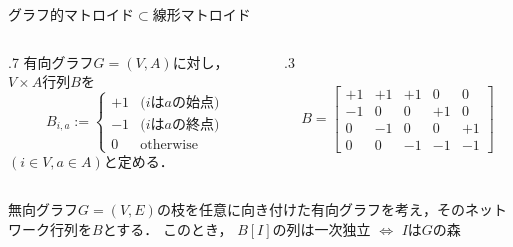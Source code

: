 \documentclass[14pt,aspectratio=169,xcolor=dvipsnames,table,onlytextwidth,dvipdfmx]{beamer}
\begin{document}
\begin{frame}{グラフ的マトロイド$\subset$線形マトロイド}
    \small

    \bigskip
    \begin{columns}
    \begin{column}{.7\textwidth}
     有向グラフ$G = (V, A)$に対し，\\ 
    $V \times A$行列$B$を
    \[
        B_{i,a} := \begin{cases}
            +1 & \text{($i$は$a$の始点)} \\
            -1 & \text{($i$は$a$の終点)} \\
            0  & \text{otherwise}
        \end{cases} 
    \]
    $(i \in V, a \in A)$と定める．
    \end{column}
    \begin{column}{.3\textwidth}
        \centering
        \footnotesize
        \[
            B = \begin{bmatrix}
            +1 & +1 & +1 & 0 & 0 \\
            -1 & 0 & 0 & +1 & 0 \\
            0 & -1 & 0 & 0 & +1 \\
            0 & 0 & -1 & -1 & -1
            \end{bmatrix}
        \]
    \end{column}
    \end{columns}

    \vfill
    \begin{lemma}
        無向グラフ$G = (V, E)$の枝を任意に向き付けた有向グラフを考え，そのネットワーク行列を$B$とする．
        このとき，
        $B[I]$の列は一次独立 $\iff$ $I$は$G$の森
    \end{lemma}
\end{frame}
\end{document}
